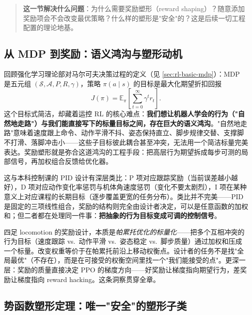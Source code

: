 \begin{quote}\small
\textbf{这一节解决什么问题}：为什么需要奖励塑形（reward shaping）？随意添加奖励项会不会改变最优策略？什么样的塑形是"安全"的？这是后续一切工程配置的理论地基。
\end{quote}

\subsection{从 MDP 到奖励：语义鸿沟与塑形动机}
\label{sec:rlmc-rew-gap}

回顾强化学习理论部对马尔可夫决策过程的定义（见 \cref{sec:rl-basic-mdp}）：MDP 是五元组 $(\mathcal S,\mathcal A,P,R,\gamma)$，策略 $\pi(a\mid s)$ 的目标是最大化期望折扣回报
\begin{equation}
J(\pi)=\mathbb E_{\pi}\!\left[\sum_{t=0}^{\infty}\gamma^{t} r_t\right].
\label{eq:rlmc-rew-return}
\end{equation}
这个目标式简洁，却藏着运控 RL 的核心难点：\textbf{我们想让机器人学会的行为（"自然地走路"）与我们能直接写下的标量目标之间，存在巨大的语义鸿沟}。"自然地走路"意味着速度跟上命令、动作平滑不抖、姿态保持直立、脚步规律交替、支撑脚不打滑、落脚冲击小——这些子目标彼此耦合甚至冲突，无法用一个简洁标量完美表达。奖励塑形就是弥合这道鸿沟的工程手段：把高层行为期望拆成每步可测的局部信号，再加权组合反馈给优化器。

这与本科控制课的 PID 设计有深层类比：P 项对应跟踪奖励（当前误差越小越好），D 项对应动作变化率惩罚与机体角速度惩罚（变化不要太剧烈），I 项在某种意义上对应课程的长期目标（逐步覆盖更宽的任务分布）。类比并不完美——PID 是固定的三项线性组合，奖励的结构则完全由设计者决定，可以是任意函数的加权和；但二者都在处理同一件事：\textbf{把抽象的行为目标变成可调的控制信号}。

\begin{insight}\label{ins:rlmc-rew-shaping}
四足 locomotion 的奖励设计，本质是\emph{帕累托优化的标量化}——把多个互相冲突的行为目标（速度跟踪 vs.\ 动作平滑 vs.\ 姿态稳定 vs.\ 脚步质量）通过加权和压成一个标量。改变权重等价于在帕累托前沿上移动权衡点。设计者的任务不是找"全局最优"（不存在），而是在可接受的权衡空间里找一个"我们能接受的点"。更深一层：奖励的质量直接决定 PPO 的梯度方向——好奖励让梯度指向期望行为，差奖励让梯度指向 reward hacking。这条洞察贯穿全章。
\end{insight}

\subsection{势函数塑形定理：唯一"安全"的塑形子类}
\label{sec:rlmc-rew-pbrs}

